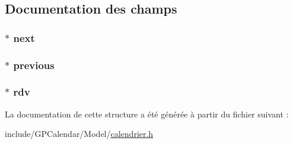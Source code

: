 \subsection{Documentation des champs}
\hypertarget{struct_node_rendez_vous_a84662a2ba345d017dd59a013b040e53e}{
\subsubsection[{next}]{$\ast$ next}}\label{struct_node_rendez_vous_a84662a2ba345d017dd59a013b040e53e}
\hypertarget{struct_node_rendez_vous_ab9f2e3f151f5b84ed16f14e554374470}{
\subsubsection[{previous}]{$\ast$ previous}}\label{struct_node_rendez_vous_ab9f2e3f151f5b84ed16f14e554374470}
\hypertarget{struct_node_rendez_vous_af79db64558cdbcd5406072274edcc1b5}{
\subsubsection[{rdv}]{$\ast$ rdv}}\label{struct_node_rendez_vous_af79db64558cdbcd5406072274edcc1b5}


La documentation de cette structure a été générée à partir du fichier suivant \-:\begin{DoxyCompactItemize}
\item 
include/\-G\-P\-Calendar/\-Model/\hyperlink{calendrier_8h}{calendrier.\-h}\end{DoxyCompactItemize}
